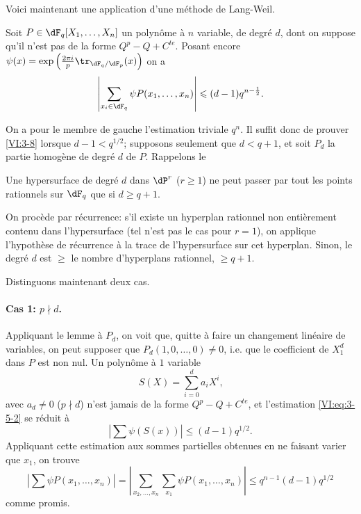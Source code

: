 Voici maintenant une application d'une méthode de Lang-Weil. 





\begin{proposition_}\label{VI:3-8}
Soit $P\in \dF_q[X_1,\dots,X_n]$ un polynôme à $n$ variable, de degré 
$d$, dont on suppose qu'il n'est pas de la forme $Q^p-Q+C^{te}$. Posant encore 
$\psi(x) = \exp\left(\frac{2\pi i}{p} \tr_{\dF_q/\dF_p}(x)\right)$ on a 
\[
  \left|\sum_{x_i\in \dF_q} \psi P(x_1,\dots,x_n)\right| \leqslant (d-1) q^{n-\frac 1 2} \text{.}
\]
\end{proposition_}

On a pour le membre de gauche l'estimation triviale $q^n$. Il suffit donc de 
prouver \ref{VI:3-8} lorsque $d-1<q^{1/2}$; supposons seulement que 
$d<q+1$, et soit $P_d$ la partie homogène de degré $d$ de $P$. Rappelons le 





\begin{lemma_}\label{VI:3-9}
Une hypersurface de degré $d$ dans $\dP^r$ ($r\geqslant 1$) ne peut passer 
par tout les points rationnels sur $\dF_q$ que si $d\geqslant q+1$. 
\end{lemma_}

On procède par récurrence: s'il existe un hyperplan rationnel non 
entièrement contenu dans l'hypersurface (tel n'est pas le cas pour $r=1$), on 
applique l'hypothèse de récurrence à la trace de l'hypersurface sur cet 
hyperplan. Sinon, le degré $d$ est $\geqslant$ le nombre d'hyperplans 
rationnel, $\geqslant q+1$. 

Distinguons maintenant deux cas. 


\paragraph{Cas 1: $p\nmid d$.}
Appliquant le lemme à $P_d$, on voit que, quitte à faire un changement 
linéaire de variables, on peut supposer que $P_d(1,0,\ldots,0)\ne 0$, i.e. 
que le coefficient de $X_1^d$ dans $P$ est non nul. Un polynôme à $1$ 
variable 
\[
  S(X) = \sum_{i=0}^d a_i X^i \text{,} 
\]
avec $a_d\ne 0$ ($p\nmid d$) n'est jamais de la forme $Q^p-Q+C^{t e}$, et 
l'estimation \eqref{VI:eq:3-5-2} se réduit à 
\[
  \left| \sum \psi(S(x)) \right| \leqslant (d-1) q^{1/2} \text{.} 
\]
Appliquant cette estimation aux sommes partielles obtenues en ne faisant varier 
que $x_1$, on trouve 
\[
  \left| \sum \psi P(x_1,\dots,x_n) \right| = \left| \sum_{x_2,\dots,x_n} \sum_{x_1} \psi P(x_1,\dots,x_n)\right| \leqslant q^{n-1} (d-1) q^{1/2} 
\]
comme promis. 


